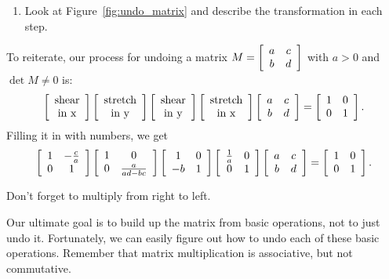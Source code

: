\documentclass[../gatm.tex]{subfiles}
\begin{document}
\begin{enumerate}
\setcounter{enumi}{\value{problem_i}}
\item Look at Figure~\ref{fig:undo_matrix} and describe the transformation in each step.
\setcounter{problem_i}{\value{enumi}}
\end{enumerate}

To reiterate, our process for undoing a matrix $M=\left[\begin{array}{cc} a & c \\ b & d \end{array}\right]$ with $a>0$ and $\det M\neq 0$ is:
$$\left[\begin{array}{c}\text{shear} \\ \text{in x}\end{array}\right]
\left[\begin{array}{c}\text{stretch} \\ \text{in y}\end{array}\right]
\left[\begin{array}{c}\text{shear} \\ \text{in y}\end{array}\right]
\left[\begin{array}{c}\text{stretch} \\ \text{in x}\end{array}\right]
\left[\begin{array}{cc} a & c \\ b & d \end{array}\right]=\left[\begin{array}{cc} 1 & 0 \\ 0 & 1 \end{array}\right].$$
Filling it in with numbers, we get
$$\left[\begin{array}{cc} 1 & -\frac{c}{a} \\ 0 & 1 \end{array}\right]\left[\begin{array}{cc} 1 & 0 \\ 0 & \frac{a}{ad-bc} \end{array}\right]\left[\begin{array}{cc} 1 & 0 \\ -b & 1 \end{array}\right]\left[\begin{array}{cc} \frac{1}{a} & 0 \\ 0 & 1 \end{array}\right]\left[\begin{array}{cc} a & c \\ b & d \end{array}\right]=\left[\begin{array}{cc} 1 & 0 \\ 0 & 1 \end{array}\right].$$ \label{prob:list_of_matrices}

Don't forget to multiply from right to left.

Our ultimate goal is to build up the matrix from basic operations, not to just undo it. Fortunately, we can easily figure out how to undo each of these basic operations. Remember that matrix multiplication is associative, but not commutative.
\vspace{10ex}
\end{document}
